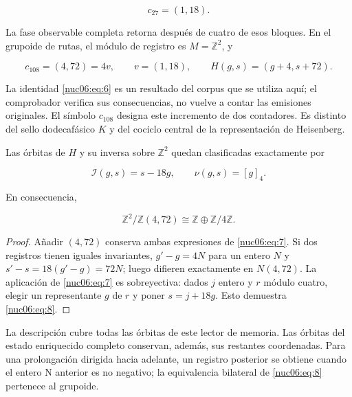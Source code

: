 \[
c_{27}=(1,18).
\]

La fase observable completa retorna después de cuatro de esos bloques. En el grupoide de rutas, el módulo de registro es \(M=\mathbb Z^2\), y

\begin{equation}
c_{108}=(4,72)=4v,\qquad v=(1,18),\qquad
H(g,s)=(g+4,s+72).
\label{nuc06:eq:6}
\end{equation}

La identidad \eqref{nuc06:eq:6} es un resultado del corpus que se utiliza aquí; el comprobador verifica sus consecuencias, no vuelve a contar las emisiones originales. El símbolo \(c_{108}\) designa este incremento de dos contadores. Es distinto del sello dodecafásico \(K\) y del cociclo central de la representación de Heisenberg.

\begin{theorem}

Las órbitas de \(H\) y su inversa sobre \(\mathbb Z^2\) quedan clasificadas exactamente por

\begin{equation}
\boxed{\quad \mathcal I(g,s)=s-18g,\qquad \nu(g,s)=[g]_4.\quad}
\label{nuc06:eq:7}
\end{equation}

En consecuencia,

\begin{equation}
\mathbb Z^2/\mathbb Z(4,72)\cong\mathbb Z\oplus\mathbb Z/4\mathbb Z.
\label{nuc06:eq:8}
\end{equation}
\end{theorem}

\begin{proof}
Añadir \((4,72)\) conserva ambas expresiones de \eqref{nuc06:eq:7}. Si dos registros tienen iguales invariantes, \(g'-g=4N\) para un entero \(N\) y \(s'-s=18(g'-g)=72N\); luego difieren exactamente en \(N(4,72)\). La aplicación de \eqref{nuc06:eq:7} es sobreyectiva: dados \(j\) entero y \(r\) módulo cuatro, elegir un representante \(g\) de \(r\) y poner \(s=j+18g\). Esto demuestra \eqref{nuc06:eq:8}.
\end{proof}

La descripción cubre todas las órbitas de este lector de memoria. Las órbitas del estado enriquecido completo conservan, además, sus restantes coordenadas. Para una prolongación dirigida hacia adelante, un registro posterior se obtiene cuando el entero N anterior es no negativo; la equivalencia bilateral de \eqref{nuc06:eq:8} pertenece al grupoide.


